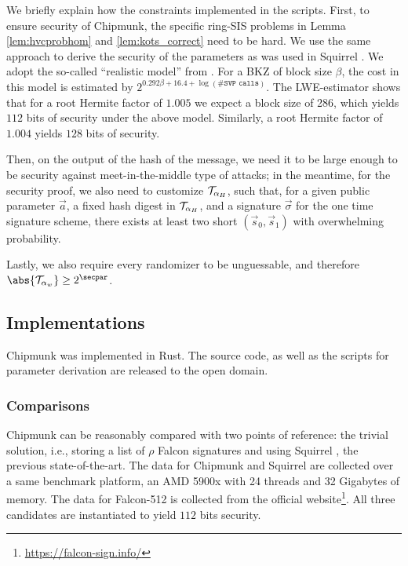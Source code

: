 We briefly explain how the constraints implemented in the scripts.
First, to ensure security of Chipmunk, the specific ring-SIS problems in Lemma \ref{lem:hvcprobhom} and \ref{lem:kots_correct} need to be hard.
We use the same approach to derive the security of the parameters as was used in Squirrel \cite{CCS:FleSimZha22}.
We adopt the so-called \enquote{realistic model} from \cite{USENIX:ADPS16}.
For a BKZ of block size $\beta$, the cost in this model is estimated by
$2^{0.292\beta+16.4+\log(\#\texttt{SVP calls})}$. 
The LWE-estimator \cite{DBLP:journals/jmc/AlbrechtPS15}
shows that for a root Hermite factor of $1.005$ we expect a block size of 286, which yields $112$ bits of security under the above model.
Similarly, a root Hermite factor of $1.004$ yields $128$ bits of security.

Then, on the output of the hash of the message, we need it to be large enough
to be security against meet-in-the-middle type of attacks; 
in the meantime, for the security proof,
we also need to customize $\mathcal{T}_{\alpha_H}$, such that, 
for a given public parameter $\vec{a}$, a fixed hash digest in $\mathcal{T}_{\alpha_H}$,
and a signature $\vec{\sigma}$ for the one time signature scheme,
there exists at least two short $(\vec{s}_0, \vec{s}_1)$ with overwhelming probability.

Lastly, we also require every randomizer to be unguessable, and therefore $\abs{\tern_{\alpha_w}} \geq 2^\secpar$.

\subsection{Implementations}
Chipmunk was implemented in Rust. The source code, as well as the scripts for parameter derivation are released to the open domain.

\subsubsection{Comparisons}\label{ss:comparison}
Chipmunk can be reasonably compared with two points of reference:
the trivial solution, i.e., storing a list of $\rho$ Falcon signatures and using
Squirrel \cite{CCS:FleSimZha22}, the previous state-of-the-art.
The data for Chipmunk and Squirrel are collected over a same benchmark platform, an AMD 5900x with 24 threads and 32 Gigabytes of memory.
The data for Falcon-512 is collected from the official website\footnote{\url{https://falcon-sign.info/}}.
All three candidates are instantiated to yield $112$ bits security.

